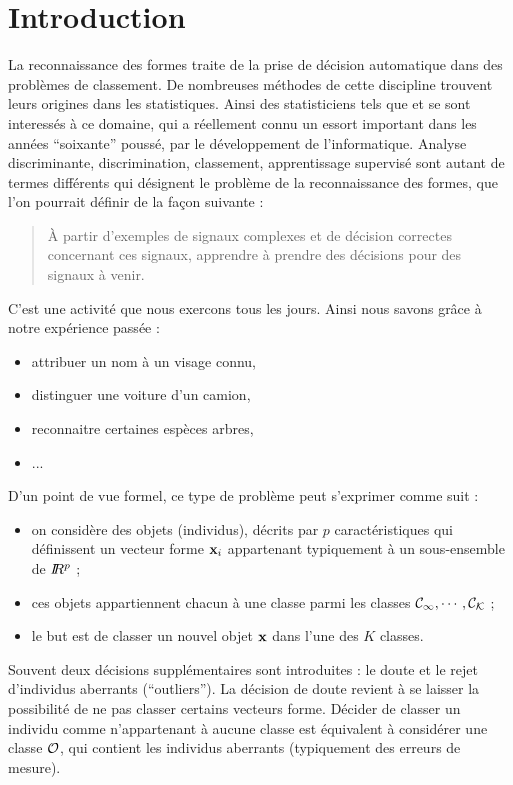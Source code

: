 \chapter*{Introduction}



La reconnaissance des formes traite de
la prise de d\'ecision automatique dans des probl\`emes de
classement. De nombreuses m\'ethodes 
de cette discipline trouvent leurs origines dans les statistiques.
Ainsi des statisticiens tels que   et 
se sont interess\'es \`a ce domaine,  qui a
r\'eellement connu un essort important dans les ann\'ees ``soixante''
pouss\'e, par le d\'eveloppement de l'informatique.  
Analyse discriminante, discrimination, classement, apprentissage
supervis\'e sont autant de termes diff\'erents qui d\'esignent 
le probl\`eme de la reconnaissance des formes, que l'on pourrait
d\'efinir de la fa\c{c}on suivante :  
\begin{quote}
\`A partir d'exemples de signaux complexes et de d\'ecision correctes
concernant ces signaux, apprendre \`a prendre des d\'ecisions pour
des signaux \`a venir.
\end{quote}
C'est une activit\'e  que nous exercons tous les jours.
Ainsi nous savons gr\^ace \`a notre exp\'erience pass\'ee :
\begin{itemize}
\item attribuer un nom \`a un visage connu,
\item distinguer une voiture d'un camion,
\item reconnaitre certaines esp\`eces arbres,
\item ...
\end{itemize}
D'un point de vue formel, ce type de probl\`eme peut s'exprimer comme
suit :
\begin{itemize}
\item on consid\`ere des objets (individus), d\'ecrits par $p$ 
 caract\'eristiques qui d\'efinissent un vecteur forme $\mbox{\bf x}_i$ 
appartenant typiquement \`a un sous-ensemble de $I\!\!R^p$ ;
\item ces objets appartiennent chacun \`a une classe parmi les classes 
$\cal{C}_1,\cdots,\cal{C}_K$ ;
\item le but est de classer un nouvel objet $\mbox{\bf x}$  dans l'une des $K$
classes. 
\end{itemize}
Souvent deux d\'ecisions suppl\'ementaires sont introduites : 
le doute et le rejet d'individus aberrants (``outliers'').
La  d\'ecision de  doute  revient \`a se laisser la possibilit\'e
de ne pas classer certains vecteurs forme. D\'ecider de classer
un individu comme n'appartenant \`a aucune classe est \'equivalent \`a 
consid\'erer une classe  $\cal{O}$, qui contient les
individus aberrants (typiquement des erreurs de mesure).

